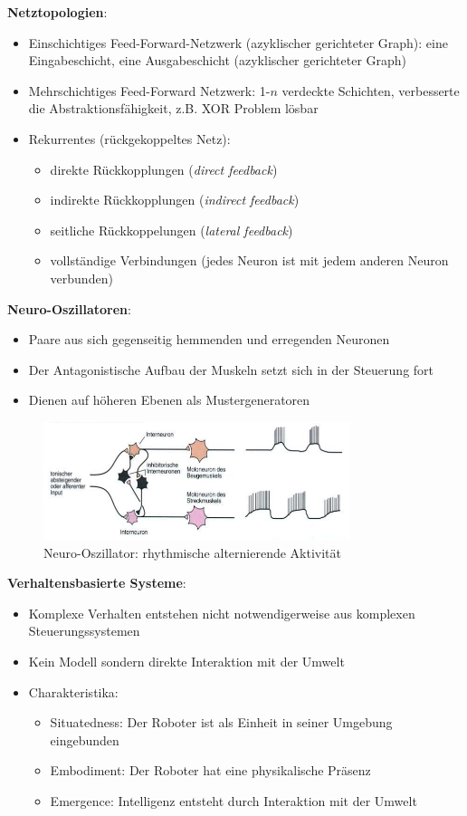 \textbf{Netztopologien}:
\begin{itemize}
\item Einschichtiges Feed-Forward-Netzwerk (azyklischer gerichteter Graph): eine Eingabeschicht, eine Ausgabeschicht (azyklischer gerichteter Graph)
\item Mehrschichtiges Feed-Forward Netzwerk: 1-$n$ verdeckte Schichten, verbesserte die Abstraktionsfähigkeit, z.B. XOR Problem lösbar
\item Rekurrentes (rückgekoppeltes Netz):
\begin{itemize}
\item direkte Rückkopplungen (\textit{direct feedback})
\item indirekte Rückkopplungen (\textit{indirect feedback})
\item seitliche Rückkoppelungen (\textit{lateral feedback})
\item vollständige Verbindungen (jedes Neuron ist mit jedem anderen Neuron verbunden)
\end{itemize}
\end{itemize}
\newpage
\textbf{Neuro-Oszillatoren}:
\begin{itemize}
\item Paare aus sich gegenseitig hemmenden und erregenden Neuronen
\item Der Antagonistische Aufbau der Muskeln setzt sich in der Steuerung fort
\item Dienen auf höheren Ebenen als Mustergeneratoren
\end{itemize}
\begin{figure}[h!]
	\centering
	\includegraphics[width=0.8\textwidth]{figures/ch05_NeuroOs.png}
	\caption{Neuro-Oszillator: rhythmische alternierende Aktivität}
\end{figure}
\textbf{Verhaltensbasierte Systeme}:
\begin{itemize}
\item Komplexe Verhalten entstehen nicht notwendigerweise aus komplexen Steuerungssystemen
\item Kein Modell sondern direkte Interaktion mit der Umwelt
\item Charakteristika:
\begin{itemize}
\item Situatedness: Der Roboter ist als Einheit in seiner Umgebung eingebunden
\item Embodiment: Der Roboter hat eine physikalische Präsenz
\item Emergence: Intelligenz entsteht durch Interaktion mit der Umwelt
\end{itemize}
\end{itemize}
